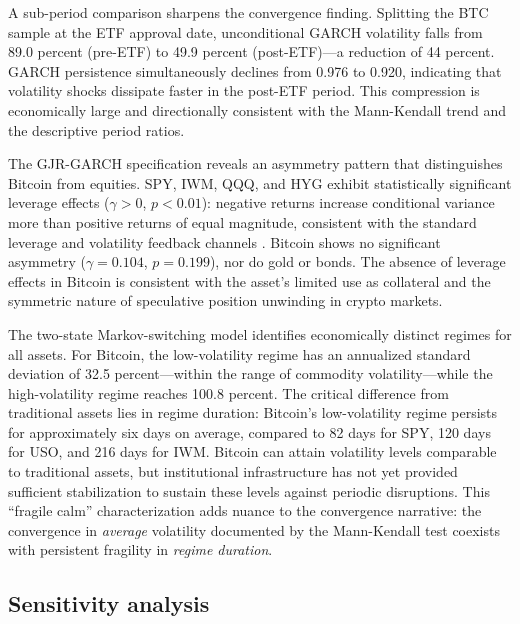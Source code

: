 \documentclass[12pt,a4paper]{article}
\begin{document}
A sub-period comparison sharpens the convergence finding. Splitting the BTC
sample at the ETF approval date, unconditional GARCH volatility falls from
89.0 percent (pre-ETF) to 49.9 percent (post-ETF)---a reduction of 44
percent. GARCH persistence simultaneously declines from 0.976 to 0.920,
indicating that volatility shocks dissipate faster in the post-ETF period.
This compression is economically large and directionally consistent with
the Mann-Kendall trend and the descriptive period ratios.




The GJR-GARCH specification reveals an asymmetry pattern that distinguishes
Bitcoin from equities. SPY, IWM, QQQ, and HYG exhibit statistically
significant leverage effects ($\gamma > 0$, $p < 0.01$): negative returns
increase conditional variance more than positive returns of equal magnitude,
consistent with the standard leverage and volatility feedback channels
\citep{glosten1993relation}. Bitcoin shows no significant asymmetry
($\gamma = 0.104$, $p = 0.199$), nor do gold or bonds. The absence of
leverage effects in Bitcoin is consistent with the asset's limited use as
collateral and the symmetric nature of speculative position unwinding in
crypto markets.

The two-state Markov-switching model identifies economically distinct
regimes for all assets. For Bitcoin, the low-volatility regime has an
annualized standard deviation of 32.5 percent---within the range of
commodity volatility---while the high-volatility regime reaches 100.8
percent. The critical difference from traditional assets lies in regime
duration: Bitcoin's low-volatility regime persists for approximately six
days on average, compared to 82 days for SPY, 120 days for USO, and 216
days for IWM. Bitcoin can attain volatility levels comparable to
traditional assets, but institutional infrastructure has not yet provided
sufficient stabilization to sustain these levels against periodic
disruptions. This ``fragile calm'' characterization adds nuance to the
convergence narrative: the convergence in \emph{average} volatility
documented by the Mann-Kendall test coexists with persistent fragility in
\emph{regime duration}.

\FloatBarrier

\subsection{Sensitivity analysis}\label{sec:res-sensitivity}
\end{document}
